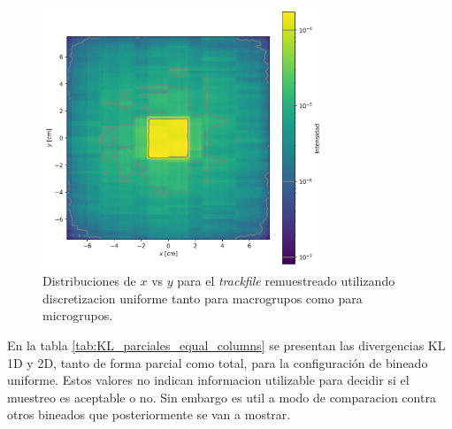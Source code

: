 \begin{figure}[H]
    \centering
    \includegraphics[width=0.75\textwidth]{figs/fig4_6.png}
    \caption{Distribuciones de $x$ vs $y$ para el \emph{trackfile} remuestreado utilizando discretizacion uniforme tanto para macrogrupos como para microgrupos.}
    \label{fig:trackfile1_x_y_uniforme}
\end{figure}

En la tabla \ref{tab:KL_parciales_equal_columns} se presentan las divergencias KL 1D y 2D, tanto de forma parcial como total, para la configuración de bineado uniforme. Estos valores no indican informacion utilizable para decidir si el muestreo es aceptable o no. Sin embargo es util a modo de comparacion contra otros bineados que posteriormente se van a mostrar. 

